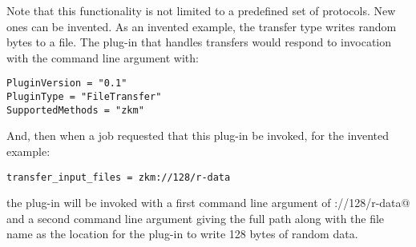 Note that this functionality is not limited to a predefined set
of protocols.
New ones can be invented.
As an invented example,
the \verb@zkm@ transfer type writes random bytes to a file.
The plug-in that handles \verb@zkm@ transfers would respond to 
invocation with the  command line argument with:
\footnotesize
\begin{verbatim}
PluginVersion = "0.1"
PluginType = "FileTransfer"
SupportedMethods = "zkm"
\end{verbatim}
\normalsize
And, then when a job requested that this plug-in be invoked,
for the invented example:
\footnotesize
\begin{verbatim}
transfer_input_files = zkm://128/r-data
\end{verbatim}
\normalsize
the plug-in will be invoked with a first command line argument
of \verb@zkm://128/r-data@ and a second command line argument giving
the full path along with the file name  as the location
for the plug-in to write 128 bytes of random data.
